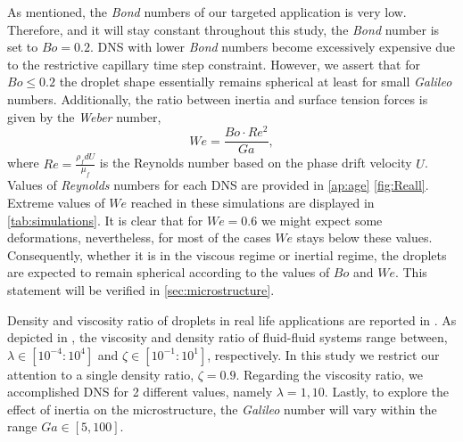 As mentioned, the \textit{Bond} numbers of our targeted application is very low.
Therefore, and it will stay constant throughout this study, the \textit{Bond} number is set to $Bo = 0.2$.
DNS with lower \textit{Bond} numbers become excessively expensive due to the restrictive capillary time step constraint. 
However, we assert that for $Bo \leq 0.2$ the droplet shape essentially remains spherical at least for small \textit{Galileo} numbers. 
Additionally, the ratio between inertia and surface tension forces is given by the \textit{Weber} number, 
\begin{equation*}
    We = \frac{Bo \cdot Re^2}{Ga},
\end{equation*}
where $Re = \frac{\rho_f d U}{\mu_f}$ is the Reynolds number based on the phase drift velocity $U$.
Values of \textit{Reynolds} numbers for each DNS are provided in \ref{ap:age} \ref{fig:Reall}. 
Extreme values of $We$ reached in these simulations are displayed in \ref{tab:simulations}. 
It is clear that for $We=0.6$ we might expect some deformations, nevertheless, for most of the cases $We$ stays below these values. 
Consequently, whether it is in the viscous regime or inertial regime, the droplets are expected to remain spherical according to the values of $Bo$ and $We$.
This statement will be verified in \ref{sec:microstructure}. 

Density and viscosity ratio of droplets in real life applications are reported in \citet[Figure 1.]{balla2020effect}.
As depicted in \citet[Figure 1.]{balla2020effect}, the viscosity and density ratio of fluid-fluid systems range between, $\lambda \in [10^{-4} : 10^4]$ and $\zeta \in [10^{-1} : 10^1]$, respectively. 
In this study we restrict our attention to a single density ratio, $\zeta = 0.9$.
Regarding the viscosity ratio, we accomplished DNS for 2 different values, namely $\lambda = 1,10$.
Lastly, to explore the effect of inertia on the microstructure, the \textit{Galileo} number will vary within the range $Ga \in [5,100]$.

